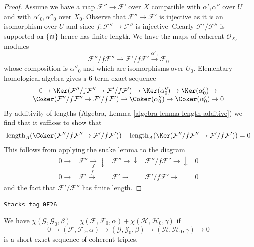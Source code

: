 \begin{proof}
\medskip\noindent
Assume we have a map $\mathcal{F}'' \to \mathcal{F}'$ over $X$ compatible with
$\alpha', \alpha''$ over $U$ and with $\alpha'_0, \alpha''_0$ over $X_0$.
Observe that $\mathcal{F}'' \to \mathcal{F}'$ is injective as it is an
isomorphism over $U$ and since $f : \mathcal{F}'' \to \mathcal{F}''$
is injective. Clearly $\mathcal{F}'/\mathcal{F}''$ is supported on
$\{\mathfrak m\}$ hence has finite length. We have the maps
of coherent $\mathcal{O}_{X_0}$-modules
$$
\mathcal{F}''/f\mathcal{F}'' \to
\mathcal{F}'/f\mathcal{F}' \xrightarrow{\alpha'_0}
\mathcal{F}_0
$$
whose composition is $\alpha''_0$ and which are isomorphisms over $U_0$.
Elementary homological algebra gives a $6$-term exact sequence
$$
\begin{matrix}
0 \to
\Ker(\mathcal{F}''/f\mathcal{F}'' \to \mathcal{F}'/f\mathcal{F}') \to
\Ker(\alpha''_0) \to
\Ker(\alpha'_0) \to \\
\Coker(\mathcal{F}''/f\mathcal{F}'' \to \mathcal{F}'/f\mathcal{F}') \to
\Coker(\alpha''_0) \to
\Coker(\alpha'_0) \to 0
\end{matrix}
$$
By additivity of lengths (Algebra, Lemma \ref{algebra-lemma-length-additive})
we find that it suffices to show that
$$
\text{length}_A(
\Coker(\mathcal{F}''/f\mathcal{F}'' \to \mathcal{F}'/f\mathcal{F}')) -
\text{length}_A(
\Ker(\mathcal{F}''/f\mathcal{F}'' \to \mathcal{F}'/f\mathcal{F}')) = 0
$$
This follows from applying the snake lemma to
the diagram
$$
\begin{array}{ccccc}0 \longrightarrow & \mathcal{F}'' \underset{f}{\longrightarrow}\downarrow & \mathcal{F}'' \longrightarrow\downarrow & \mathcal{F}''/f\mathcal{F}'' \longrightarrow\downarrow & 0 \\ 0 \longrightarrow & \mathcal{F}' \overset{f}{\longrightarrow} & \mathcal{F}' \longrightarrow & \mathcal{F}'/f\mathcal{F}' \longrightarrow & 0\end{array}
$$
and the fact that $\mathcal{F}'/\mathcal{F}''$ has finite length.
\end{proof}

\begin{lemma}
\label{algebraization-lemma-ses-chi-triple}
\href{https://stacks.math.columbia.edu/tag/0F26}{\texttt{Stacks tag 0F26}}

We have
$\chi(\mathcal{G}, \mathcal{G}_0, \beta) =
\chi(\mathcal{F}, \mathcal{F}_0, \alpha) +
\chi(\mathcal{H}, \mathcal{H}_0, \gamma)$ if
$$
0 \to
(\mathcal{F}, \mathcal{F}_0, \alpha) \to
(\mathcal{G}, \mathcal{G}_0, \beta) \to
(\mathcal{H}, \mathcal{H}_0, \gamma)
\to 0
$$
is a short exact sequence of coherent triples.
\end{lemma}

